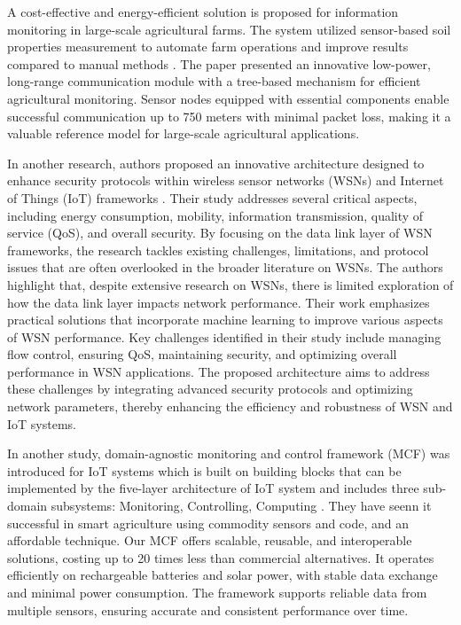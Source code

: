A cost-effective and energy-efficient solution is proposed for information monitoring in large-scale agricultural farms. The system utilized sensor-based soil properties measurement to automate farm operations and improve results compared to manual methods \cite{saqib2020low}. The paper presented an innovative low-power, long-range communication module with a tree-based mechanism for efficient agricultural monitoring. Sensor nodes equipped with essential components enable successful communication up to 750 meters with minimal packet loss, making it a valuable reference model for large-scale agricultural applications.

In another research, authors proposed an innovative architecture designed to enhance security protocols within wireless sensor networks (WSNs) and Internet of Things (IoT) frameworks \cite{hasan2023efficient}. Their study addresses 
several critical aspects, including energy consumption, mobility, information transmission, quality of service (QoS), and overall security. By 
focusing on the data link layer of WSN frameworks, the research tackles existing challenges, limitations, and protocol issues that are often overlooked in the broader literature on WSNs. The authors highlight that, despite extensive research on WSNs, there is limited exploration of how the data link layer impacts network performance. Their work emphasizes practical solutions that incorporate machine learning to improve various aspects of WSN performance. Key challenges identified in their study include managing flow control, ensuring QoS, maintaining security, and optimizing overall performance in WSN applications. The proposed architecture aims to address these challenges by integrating advanced security protocols and optimizing network parameters, thereby enhancing the efficiency and robustness of WSN and IoT systems.

In another study, domain-agnostic monitoring and control framework (MCF) was introduced for IoT systems which is built on building blocks that can be implemented by the five-layer architecture of IoT system and includes three sub-domain subsystems: Monitoring, Controlling, Computing \cite{senoo2023monitoring}. They have seenn it successful in smart agriculture using commodity sensors and code, and an affordable technique. Our MCF offers scalable, reusable, and interoperable solutions, costing up to 20 times less than commercial alternatives. It operates efficiently on rechargeable batteries and solar power, with stable data exchange and minimal power consumption. The framework supports reliable data from multiple sensors, ensuring accurate and consistent performance over time.

